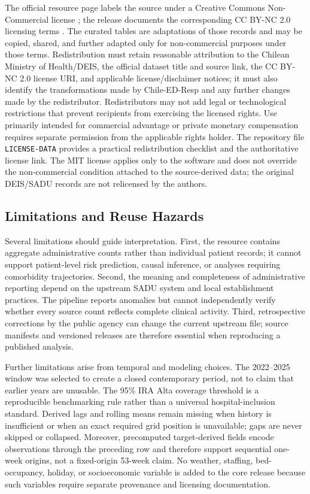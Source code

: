 \documentclass[data,datadescriptor,submit,moreauthors,pdftex]{Definitions/mdpi}
\newcommand{\datasetname}{Chile-ED-Resp}
\begin{document}
The official resource page labels the source under a Creative Commons Non-Commercial license \citep{DEIS2026}; the release documents the corresponding CC BY-NC 2.0 licensing terms \citep{CreativeCommonsBYNC20}. The curated tables are adaptations of those records and may be copied, shared, and further adapted only for non-commercial purposes under those terms. Redistribution must retain reasonable attribution to the Chilean Ministry of Health/DEIS, the official dataset title and source link, the CC BY-NC 2.0 license URI, and applicable license/disclaimer notices; it must also identify the transformations made by \datasetname{} and any further changes made by the redistributor. Redistributors may not add legal or technological restrictions that prevent recipients from exercising the licensed rights. Use primarily intended for commercial advantage or private monetary compensation requires separate permission from the applicable rights holder. The repository file \texttt{LICENSE-DATA} provides a practical redistribution checklist and the authoritative license link. The MIT license applies only to the software and does not override the non-commercial condition attached to the source-derived data; the original DEIS/SADU records are not relicensed by the authors.

\subsection{Limitations and Reuse Hazards}

Several limitations should guide interpretation. First, the resource contains aggregate administrative counts rather than individual patient records; it cannot support patient-level risk prediction, causal inference, or analyses requiring comorbidity trajectories. Second, the meaning and completeness of administrative reporting depend on the upstream SADU system and local establishment practices. The pipeline reports anomalies but cannot independently verify whether every source count reflects complete clinical activity. Third, retrospective corrections by the public agency can change the current upstream file; source manifests and versioned releases are therefore essential when reproducing a published analysis.

Further limitations arise from temporal and modeling choices. The 2022--2025 window was selected to create a closed contemporary period, not to claim that earlier years are unusable. The 95\% IRA Alta coverage threshold is a reproducible benchmarking rule rather than a universal hospital-inclusion standard. Derived lags and rolling means remain missing when history is insufficient or when an exact required grid position is unavailable; gaps are never skipped or collapsed. Moreover, precomputed target-derived fields encode observations through the preceding row and therefore support sequential one-week origins, not a fixed-origin 53-week claim. No weather, staffing, bed-occupancy, holiday, or socioeconomic variable is added to the core release because such variables require separate provenance and licensing documentation.
\end{document}

